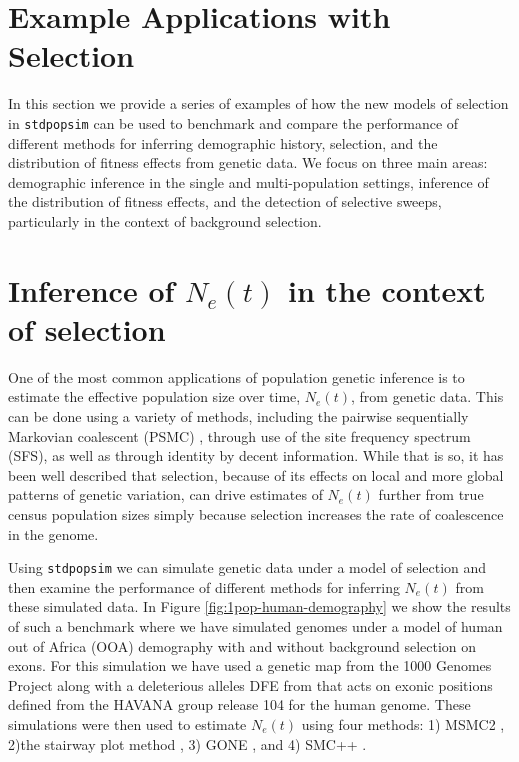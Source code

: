 \documentclass[hidelinks]{article}
\newcommand{\stdpopsim}{\texttt{stdpopsim}\xspace}
\begin{document}
\section*{Example Applications with Selection}
In this section we provide a series of examples of how the new models of selection
in \stdpopsim can be used to benchmark and compare the performance of different
methods for inferring demographic history, selection, and the distribution of fitness
effects from genetic data. We focus on three main areas: demographic inference in the 
single and multi-population settings, inference of the distribution of fitness effects,
and the detection of selective sweeps, particularly in the context of background selection.

\section*{Inference of $N_e(t)$ in the context of selection}
One of the most common applications of population genetic inference is to estimate
the effective population size over time, $N_e(t)$, from genetic data. This can be done
using a variety of methods, including the pairwise sequentially Markovian coalescent
(PSMC) \citep{li2011inference}, through use of the site frequency spectrum (SFS),
as well as through identity by decent information. 
While that is so, it has been well described that selection, because of its effects on
local and more global patterns of genetic variation, can drive estimates of $N_e(t)$
further from true census population sizes simply because selection increases the 
rate of coalescence in the genome. 

Using \stdpopsim we can simulate genetic data under a model of selection and then 
examine the performance of different methods for inferring $N_e(t)$ from these simulated 
data. In Figure \ref{fig:1pop-human-demography} we show the results of such a benchmark
where we have simulated genomes under a model of human out of Africa (OOA) demography
with and without background selection on exons. For this simulation we have used
a genetic map from the 1000 Genomes Project along with a deleterious alleles DFE from \citep{huber2017determining}
that acts on exonic positions defined from the HAVANA group release 104 for the human genome. 
These simulations were then used to estimate $N_e(t)$ using four methods: 1) MSMC2 \citep{Schiffels2020}, 
2)the stairway plot method \citep{liu2020stairway}, 3) GONE \citep{santiago2020recent}, and 4) SMC++ \citep{terhorst2017robust}.
\end{document}
